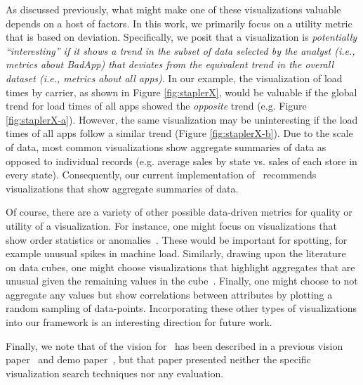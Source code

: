\noindent As discussed previously, what might make one of these visualizations valuable depends on a host of factors.
In this work, we primarily focus on a utility metric that is based on deviation.
Specifically, we posit that a visualization is {\em potentially ``interesting'' if it shows 
a trend in the subset of data selected by the analyst
(i.e., metrics about BadApp)
that deviates from the equivalent trend in the overall dataset (i.e., metrics
about all apps)}.
In our example, the visualization of load times by carrier, as shown in Figure
\ref{fig:staplerX}, would be valuable if the global trend for load times of all
apps showed the {\it opposite} trend (e.g. Figure \ref{fig:staplerX-a}).
However, the same visualization may be uninteresting if the load times of all apps
follow a similar trend (Figure \ref{fig:staplerX-b}).
Due to the scale of data, most common visualizations show aggregate summaries of data
as opposed to individual records (e.g. average sales by state vs. sales of each store 
in every state).
Consequently, our current implementation of \SeeDB\ recommends visualizations that show aggregate 
summaries of data.

Of course, there are a variety of other possible data-driven metrics for quality or utility
of a visualization.
For instance, one might focus on visualizations that show order statistics or anomalies~\cite{DBLP:conf/avi/KandelPPHH12}. 
These would be important for spotting, for example unusual spikes in machine load.
Similarly, drawing upon the literature on data cubes, one might choose visualizations that highlight aggregates that
are unusual given the remaining values in the cube~\cite{DBLP:conf/vldb/Sarawagi00}.
Finally, one might choose to not aggregate any values but show correlations between attributes by plotting a random
sampling of data-points.  Incorporating these other types of visualizations into our framework is an interesting
direction for future work.

Finally, we note that of the vision for \SeeDB\ has been described in a previous vision paper~\cite{DBLP:conf/vldb/Parameswaran2013} and demo paper~\cite{DBLP:journals/pvldb/VartakMPP14}, but
that paper presented neither the specific visualization search techniques nor any evaluation.




